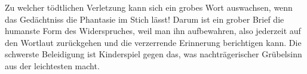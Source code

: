 Zu welcher tödtlichen Verletzung kann sich ein grobes Wort auswachsen, wenn das Gedächtniss die Phantasie im Stich lässt! Darum ist ein grober Brief die humanste Form des Widerspruches, weil man ihn aufbewahren, also jederzeit auf den Wortlaut zurückgehen und die verzerrende Erinnerung berichtigen kann. Die schwerste Beleidigung ist Kinderspiel gegen das, was nachträgerischer Grübelsinn aus der leichtesten macht.
\par

